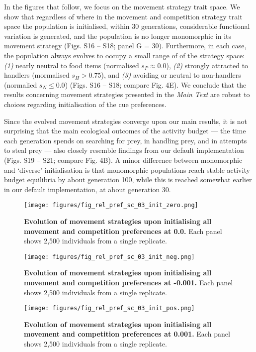 \documentclass[]{article}
\begin{document}
In the figures that follow, we focus on the movement strategy trait space.
We show that regardless of where in the movement and competition strategy trait space the population is initialised, within 30 generations, considerable functional variation is generated, and the population is no longer monomorphic in its movement strategy (Figs. S16 -- S18; panel G = 30).
Furthermore, in each case, the population always evolves to occupy a small range of of the strategy space: \emph{(1)} nearly neutral to food items (normalised \(s_P \approx 0.0\)), \emph{(2)} strongly attracted to handlers (mormalised \(s_H > 0.75\)), and \emph{(3)} avoiding or neutral to non-handlers (normalied \(s_N \leq 0.0\)) (Figs. S16 -- S18; compare Fig. 4E).
We conclude that the results concerning movement strategies presented in the \emph{Main Text} are robust to choices regarding initialisation of the cue preferences.

Since the evolved movement strategies converge upon our main results, it is not surprising that the main ecological outcomes of the activity budget --- the time each generation spends on searching for prey, in handling prey, and in attempts to steal prey --- also closely resemble findings from our default implementation (Figs. S19 -- S21; compare Fig. 4B).
A minor difference between monomorphic and `diverse' initialisation is that monomorphic populations reach stable activity budget equilibria by about generation 100, while this is reached somewhat earlier in our default implementation, at about generation 30.

\begin{figure}
\centering
\texttt{[image: figures/fig\_rel\_pref\_sc\_03\_init\_zero.png]}
\caption{\textbf{Evolution of movement strategies upon initialising all movement and competition preferences at 0.0.} Each panel shows 2,500 individuals from a single replicate.}
\end{figure}

\begin{figure}
\centering
\texttt{[image: figures/fig\_rel\_pref\_sc\_03\_init\_neg.png]}
\caption{\textbf{Evolution of movement strategies upon initialising all movement and competition preferences at -0.001.} Each panel shows 2,500 individuals from a single replicate.}
\end{figure}

\begin{figure}
\centering
\texttt{[image: figures/fig\_rel\_pref\_sc\_03\_init\_pos.png]}
\caption{\textbf{Evolution of movement strategies upon initialising all movement and competition preferences at 0.001.} Each panel shows 2,500 individuals from a single replicate.}
\end{figure}
\end{document}
